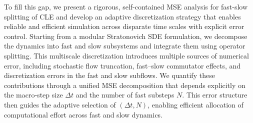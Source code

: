 \documentclass{article}
\begin{document}
To fill this gap, we present a rigorous,
self-contained MSE analysis for fast-slow splitting of CLE and develop an adaptive discretization strategy that enables reliable and efficient simulation across disparate time scales with explicit error control. 
Starting from a modular Stratonovich SDE formulation, we decompose the dynamics into fast and slow subsystems and integrate them using operator splitting. 
This multiscale discretization introduces multiple sources of numerical error, including stochastic flow truncation, fast–slow commutator effects, and discretization errors in the fast and slow subflows.
We quantify these contributions through a unified MSE decomposition that depends explicitly on the macro‑step size $\Delta t$ and the number of fast substeps $N$. This error structure then guides the adaptive selection
of $(\Delta t, N)$, enabling efficient allocation of computational effort across fast and slow dynamics.
\end{document}
